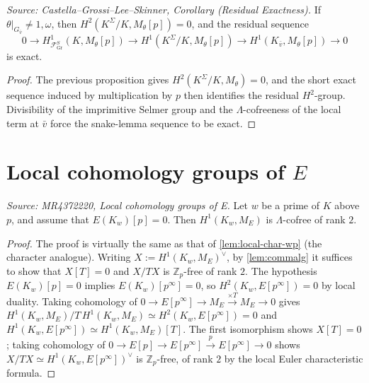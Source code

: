 \begin{corollary}
  \label{cor:characters}
  \textit{Source: Castella--Grossi--Lee--Skinner, Corollary (Residual Exactness).}
  If \(\theta|_{G_{\bar v}}\neq 1,\omega\), then \(H^2(K^\Sigma/K,M_\theta[p])=0\), and the residual sequence
  \[
    0\to H^1_{\mathcal{F}_{\mathrm{Gr}}^S}(K,M_\theta[p])\to H^1(K^\Sigma/K,M_\theta[p])\to H^1(K_{\bar v},M_\theta[p])\to 0
  \]
  is exact.
\end{corollary}

\begin{proof}
The previous proposition gives \(H^2(K^\Sigma/K,M_\theta)=0\), and the short exact sequence induced by multiplication by \(p\) then identifies the residual \(H^2\)-group. Divisibility of the imprimitive Selmer group and the \(\Lambda\)-cofreeness of the local term at \(\bar v\) force the snake-lemma sequence to be exact.
\end{proof}

\section{Local cohomology groups of \texorpdfstring{\(E\)}{E}}

\begin{lemma}
  \label{lem:local-E-cofree}
  \textit{Source: MR4372220, Local cohomology groups of E.}
  Let \(w\) be a prime of \(K\) above \(p\), and assume that \(E(K_w)[p]=0\). Then \(H^1(K_w,M_E)\) is \(\Lambda\)-cofree of rank \(2\).
\end{lemma}

\begin{proof}
The proof is virtually the same as that of \cref{lem:local-char-wp} (the character analogue). Writing \(X:=H^1(K_w,M_E)^\vee\), by \cref{lem:commalg} it suffices to show that \(X[T]=0\) and \(X/TX\) is \(\mathbb{Z}_p\)-free of rank \(2\). The hypothesis \(E(K_w)[p]=0\) implies \(E(K_w)[p^\infty]=0\), so \(H^2(K_w,E[p^\infty])=0\) by local duality. Taking cohomology of \(0\to E[p^\infty]\to M_E\xrightarrow{\times T}M_E\to 0\) gives \(H^1(K_w,M_E)/T\,H^1(K_w,M_E)\simeq H^2(K_w,E[p^\infty])=0\) and \(H^1(K_w,E[p^\infty])\simeq H^1(K_w,M_E)[T]\). The first isomorphism shows \(X[T]=0\); taking cohomology of \(0\to E[p]\to E[p^\infty]\xrightarrow{p}E[p^\infty]\to 0\) shows \(X/TX\simeq H^1(K_w,E[p^\infty])^\vee\) is \(\mathbb{Z}_p\)-free, of rank \(2\) by the local Euler characteristic formula.
\end{proof}
